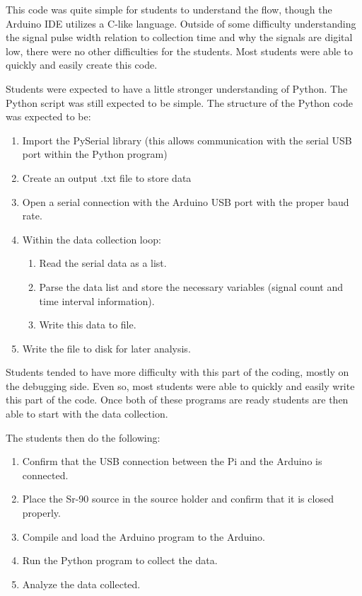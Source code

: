 This code was quite simple for students to understand the flow, though the Arduino IDE utilizes a C-like language.
Outside of some difficulty understanding the signal pulse width relation to collection time and why the signals are digital low, there were no other difficulties for the students.
Most students were able to quickly and easily create this code.

Students were expected to have a little stronger understanding of Python.
The Python script was still expected to be simple.
The structure of the Python code was expected to be:
\begin{enumerate}
\item Import the PySerial library (this allows communication with the serial USB port within the Python program)
\item Create an output .txt file to store data
\item Open a serial connection with the Arduino USB port with the proper baud rate.
\item Within the data collection loop:
  \begin{enumerate}
  \item Read the serial data as a list.
  \item Parse the data list and store the necessary variables (signal count and time interval information).
  \item Write this data to file.
    
  \end{enumerate}
\item Write the file to disk for later analysis.
  
\end{enumerate}

Students tended to have more difficulty with this part of the coding, mostly on the debugging side.
Even so, most students were able to quickly and easily write this part of the code.
Once both of these programs are ready students are then able to start with the data collection.

The students then do the following:
\begin{enumerate}
\item Confirm that the USB connection between the Pi and the Arduino is connected.
\item Place the Sr-90 source in the source holder and confirm that it is closed properly.
\item Compile and load the Arduino program to the Arduino.
\item Run the Python program to collect the data.
\item Analyze the data collected.
  
\end{enumerate}


